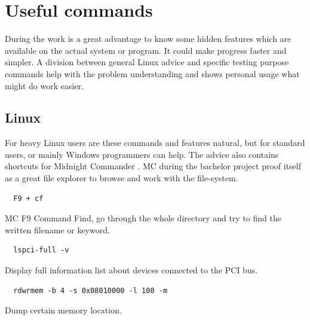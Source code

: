 \documentclass{ctuthesis}
\begin{document}
\chapter{Useful commands}
 During the work is a great advantage to know some hidden features which are available on the actual system or program. It could make progress faster and simpler. A division between general Linux advice and specific testing purpose commands help with the problem understanding and shows personal usage what might do work easier.
 \section{Linux}
  For heavy Linux users are these commands and features natural, but for standard users, or mainly Windows programmers can help. The advice also contains shortcuts for Midnight Commander \cite{mc}. MC during the bachelor project proof itself as a great file explorer to browse and work with the file-system.
  \begin{verbatim}  F9 + cf\end{verbatim}
  MC F9 Command Find, go through the whole directory and try to find the written filename or keyword.
  \begin{verbatim}  lspci-full -v\end{verbatim}
  Display full information list about devices connected to the PCI bus.
  \begin{verbatim}  rdwrmem -b 4 -s 0x08010000 -l 100 -m\end{verbatim}
 Dump certain memory location. \cite{rdwrmem}
\end{document}
